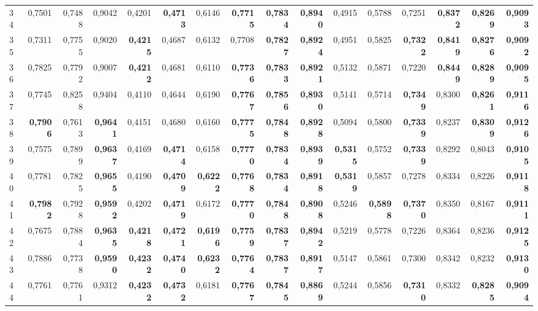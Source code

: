 \begin{table}[htp!]
\begin{adjustwidth}{-2cm}{}
\begin{tabular}{ l | *{15}{| r}}
34	&	0,7501	&	0,7488	&	0,9042	&	0,4201	&	\textbf{0,4713}	&	0,6146	&	\textbf{0,7715}	&	\textbf{0,7834}	&	\textbf{0,8940}	&	0,4915	&	0,5788	&	0,7251	&	\textbf{0,8372}	&	\textbf{0,8269}	&	\textbf{0,9093}	\\
35	&	0,7311	&	0,7755	&	0,9020	&	\textbf{0,4215}	&	0,4687	&	0,6132	&	0,7708	&	\textbf{0,7827}	&	\textbf{0,8924}	&	0,4951	&	0,5825	&	\textbf{0,7322}	&	\textbf{0,8419}	&	\textbf{0,8276}	&	\textbf{0,9092}	\\
36	&	0,7825	&	0,7792	&	0,9007	&	\textbf{0,4212}	&	0,4681	&	0,6110	&	\textbf{0,7736}	&	\textbf{0,7833}	&	\textbf{0,8921}	&	0,5132	&	0,5871	&	0,7220	&	\textbf{0,8449}	&	\textbf{0,8289}	&	\textbf{0,9095}	\\
37	&	0,7745	&	0,8258	&	0,9404	&	0,4110	&	0,4644	&	0,6190	&	\textbf{0,7767}	&	\textbf{0,7856}	&	\textbf{0,8930}	&	0,5141	&	0,5714	&	\textbf{0,7349}	&	0,8300	&	\textbf{0,8261}	&	\textbf{0,9116}	\\
38	&	\textbf{0,7906}	&	0,7613	&	\textbf{0,9641}	&	0,4151	&	0,4680	&	0,6160	&	\textbf{0,7775}	&	\textbf{0,7848}	&	\textbf{0,8928}	&	0,5094	&	0,5800	&	\textbf{0,7339}	&	0,8237	&	\textbf{0,8309}	&	\textbf{0,9126}	\\
39	&	0,7575	&	0,7899	&	\textbf{0,9637}	&	0,4169	&	\textbf{0,4714}	&	0,6158	&	\textbf{0,7770}	&	\textbf{0,7834}	&	\textbf{0,8939}	&	\textbf{0,5315}	&	0,5752	&	\textbf{0,7339}	&	0,8292	&	0,8043	&	\textbf{0,9105}	\\
40	&	0,7781	&	0,7825	&	\textbf{0,9655}	&	0,4190	&	\textbf{0,4709}	&	\textbf{0,6222}	&	\textbf{0,7768}	&	\textbf{0,7834}	&	\textbf{0,8918}	&	\textbf{0,5319}	&	0,5857	&	0,7278	&	0,8334	&	0,8226	&	\textbf{0,9118}	\\
41	&	\textbf{0,7982}	&	0,7928	&	\textbf{0,9592}	&	0,4202	&	\textbf{0,4719}	&	0,6172	&	\textbf{0,7770}	&	\textbf{0,7848}	&	\textbf{0,8908}	&	0,5246	&	\textbf{0,5898}	&	\textbf{0,7370}	&	0,8350	&	0,8167	&	\textbf{0,9111}	\\
42	&	0,7675	&	0,7884	&	\textbf{0,9635}	&	\textbf{0,4218}	&	\textbf{0,4721}	&	\textbf{0,6196}	&	\textbf{0,7759}	&	\textbf{0,7837}	&	\textbf{0,8942}	&	0,5219	&	0,5778	&	0,7226	&	0,8364	&	0,8236	&	\textbf{0,9125}	\\
43	&	0,7886	&	0,7738	&	\textbf{0,9590}	&	\textbf{0,4232}	&	\textbf{0,4740}	&	\textbf{0,6232}	&	\textbf{0,7764}	&	\textbf{0,7837}	&	\textbf{0,8917}	&	0,5147	&	0,5861	&	0,7300	&	0,8342	&	0,8232	&	\textbf{0,9130}	\\
44	&	0,7761	&	0,7761	&	0,9312	&	\textbf{0,4232}	&	\textbf{0,4732}	&	0,6181	&	\textbf{0,7767}	&	\textbf{0,7845}	&	\textbf{0,8869}	&	0,5244	&	0,5856	&	\textbf{0,7310}	&	0,8332	&	\textbf{0,8285}	&	\textbf{0,9094}	\\

\end{tabular}
\end{adjustwidth}
\end{table}
